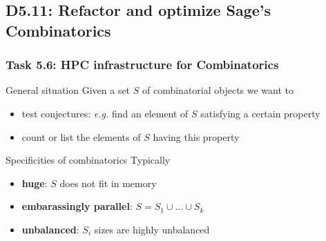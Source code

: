 \documentclass{beamer}
\begin{document}
\subsection{D5.11: Refactor and optimize Sage's Combinatorics}
\begin{frame}
  \frametitle{Task 5.6: HPC infrastructure for Combinatorics}

  \begin{block}{General situation}
    Given a set $S$ of combinatorial objects we want to
    \begin{itemize}
    \item test conjectures: \textit{e.g.} find an element of $S$ satisfying a certain
      property
    \item count or list the elements of $S$ having this property
    \end{itemize}
  \end{block}

  \begin{block}{Specificities of combinatorics}
  Typically
    \begin{itemize}
    \item \textbf{huge}: $S$ does not fit in memory
    \item \textbf{embarassingly parallel}: $S = S_1 \cup \ldots \cup S_k$
    \item \textbf{unbalanced}: $S_i$ sizes are highly unbalanced
    \end{itemize}
  \end{block}
\end{frame}
\end{document}
